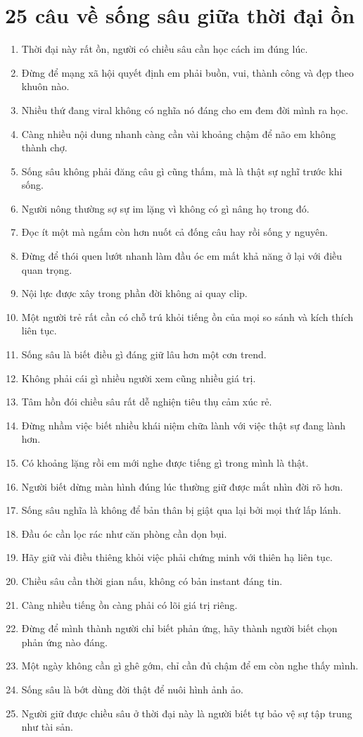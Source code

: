 \section{25 câu về sống sâu giữa thời đại ồn}
\begin{enumerate}[leftmargin=*,resume]
\item Thời đại này rất ồn, người có chiều sâu cần học cách im đúng lúc.
\item Đừng để mạng xã hội quyết định em phải buồn, vui, thành công và đẹp theo khuôn nào.
\item Nhiều thứ đang viral không có nghĩa nó đáng cho em đem đời mình ra học.
\item Càng nhiều nội dung nhanh càng cần vài khoảng chậm để não em không thành chợ.
\item Sống sâu không phải đăng câu gì cũng thấm, mà là thật sự nghĩ trước khi sống.
\item Người nông thường sợ sự im lặng vì không có gì nâng họ trong đó.
\item Đọc ít một mà ngấm còn hơn nuốt cả đống câu hay rồi sống y nguyên.
\item Đừng để thói quen lướt nhanh làm đầu óc em mất khả năng ở lại với điều quan trọng.
\item Nội lực được xây trong phần đời không ai quay clip.
\item Một người trẻ rất cần có chỗ trú khỏi tiếng ồn của mọi so sánh và kích thích liên tục.
\item Sống sâu là biết điều gì đáng giữ lâu hơn một cơn trend.
\item Không phải cái gì nhiều người xem cũng nhiều giá trị.
\item Tâm hồn đói chiều sâu rất dễ nghiện tiêu thụ cảm xúc rẻ.
\item Đừng nhầm việc biết nhiều khái niệm chữa lành với việc thật sự đang lành hơn.
\item Có khoảng lặng rồi em mới nghe được tiếng gì trong mình là thật.
\item Người biết dừng màn hình đúng lúc thường giữ được mắt nhìn đời rõ hơn.
\item Sống sâu nghĩa là không để bản thân bị giật qua lại bởi mọi thứ lấp lánh.
\item Đầu óc cần lọc rác như căn phòng cần dọn bụi.
\item Hãy giữ vài điều thiêng khỏi việc phải chứng minh với thiên hạ liên tục.
\item Chiều sâu cần thời gian nấu, không có bản instant đáng tin.
\item Càng nhiều tiếng ồn càng phải có lõi giá trị riêng.
\item Đừng để mình thành người chỉ biết phản ứng, hãy thành người biết chọn phản ứng nào đáng.
\item Một ngày không cần gì ghê gớm, chỉ cần đủ chậm để em còn nghe thấy mình.
\item Sống sâu là bớt dùng đời thật để nuôi hình ảnh ảo.
\item Người giữ được chiều sâu ở thời đại này là người biết tự bảo vệ sự tập trung như tài sản.
\end{enumerate}


